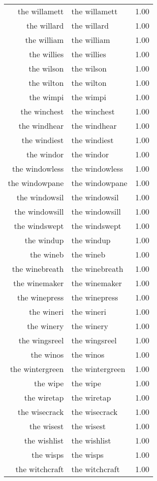 \begin{table}[ht]
\begin{tabular}{rlr}
  the willamett & the willamett & 1.00 \\ 
  the willard & the willard & 1.00 \\ 
  the william & the william & 1.00 \\ 
  the willies & the willies & 1.00 \\ 
  the wilson & the wilson & 1.00 \\ 
  the wilton & the wilton & 1.00 \\ 
  the wimpi & the wimpi & 1.00 \\ 
  the winchest & the winchest & 1.00 \\ 
  the windhear & the windhear & 1.00 \\ 
  the windiest & the windiest & 1.00 \\ 
  the windor & the windor & 1.00 \\ 
  the windowless & the windowless & 1.00 \\ 
  the windowpane & the windowpane & 1.00 \\ 
  the windowsil & the windowsil & 1.00 \\ 
  the windowsill & the windowsill & 1.00 \\ 
  the windswept & the windswept & 1.00 \\ 
  the windup & the windup & 1.00 \\ 
  the wineb & the wineb & 1.00 \\ 
  the winebreath & the winebreath & 1.00 \\ 
  the winemaker & the winemaker & 1.00 \\ 
  the winepress & the winepress & 1.00 \\ 
  the wineri & the wineri & 1.00 \\ 
  the winery & the winery & 1.00 \\ 
  the wingsreel & the wingsreel & 1.00 \\ 
  the winos & the winos & 1.00 \\ 
  the wintergreen & the wintergreen & 1.00 \\ 
  the wipe & the wipe & 1.00 \\ 
  the wiretap & the wiretap & 1.00 \\ 
  the wisecrack & the wisecrack & 1.00 \\ 
  the wisest & the wisest & 1.00 \\ 
  the wishlist & the wishlist & 1.00 \\ 
  the wisps & the wisps & 1.00 \\ 
  the witchcraft & the witchcraft & 1.00 \\ 

\end{tabular}
\end{table}
